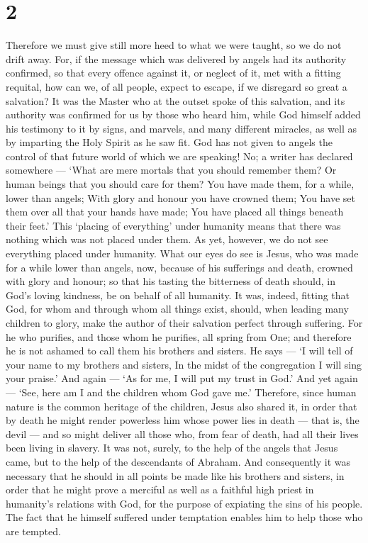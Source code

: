 \hypertarget{section-1}{%
\section{2}\label{section-1}}

 Therefore we must give still more heed to what we were
taught, so we do not drift away.  For, if the message which
was delivered by angels had its authority confirmed, so that every
offence against it, or neglect of it, met with a fitting requital,
 how can we, of all people, expect to escape, if we
disregard so great a salvation? It was the Master who at the outset
spoke of this salvation, and its authority was confirmed for us by those
who heard him,  while God himself added his testimony to it
by signs, and marvels, and many different miracles, as well as by
imparting the Holy Spirit as he saw fit.  God has not given
to angels the control of that future world of which we are speaking!
 No; a writer has declared somewhere --- `What are mere
mortals that you should remember them? Or human beings that you should
care for them?  You have made them, for a while, lower than
angels; With glory and honour you have crowned them; You have set them
over all that your hands have made;  You have placed all
things beneath their feet.' This `placing of everything' under humanity
means that there was nothing which was not placed under them. As yet,
however, we do not see everything placed under humanity. 
What our eyes do see is Jesus, who was made for a while lower than
angels, now, because of his sufferings and death, crowned with glory and
honour; so that his tasting the bitterness of death should, in God's
loving kindness, be on behalf of all humanity.  It was,
indeed, fitting that God, for whom and through whom all things exist,
should, when leading many children to glory, make the author of their
salvation perfect through suffering.  For he who purifies,
and those whom he purifies, all spring from One; and therefore he is not
ashamed to call them his brothers and sisters.  He says ---
`I will tell of your name to my brothers and sisters, In the midst of
the congregation I will sing your praise.'  And again ---
`As for me, I will put my trust in God.' And yet again --- `See, here am
I and the children whom God gave me.'  Therefore, since
human nature is the common heritage of the children, Jesus also shared
it, in order that by death he might render powerless him whose power
lies in death --- that is, the devil ---  and so might
deliver all those who, from fear of death, had all their lives been
living in slavery.  It was not, surely, to the help of the
angels that Jesus came, but to the help of the descendants of Abraham.
 And consequently it was necessary that he should in all
points be made like his brothers and sisters, in order that he might
prove a merciful as well as a faithful high priest in humanity's
relations with God, for the purpose of expiating the sins of his people.
 The fact that he himself suffered under temptation enables
him to help those who are tempted.

